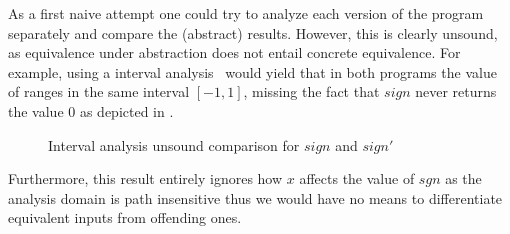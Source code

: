 As a first naive attempt one could try to analyze each version of the program separately and compare the (abstract) results. However, this is clearly unsound, as equivalence under abstraction does not entail concrete equivalence. For example, using a interval analysis~\cite{TODO} would yield that in both programs the value of  ranges in the same interval $[-1,1]$, missing the fact that $sign$ never returns the value $0$ as depicted in .
\begin{figure}
\caption{Interval analysis unsound comparison for $sign$ and $sign'$}
\end{figure} 
Furthermore, this result entirely ignores how $x$ affects the value of $sgn$ as the analysis domain is path insensitive thus we would have no means to differentiate equivalent inputs from offending ones.

